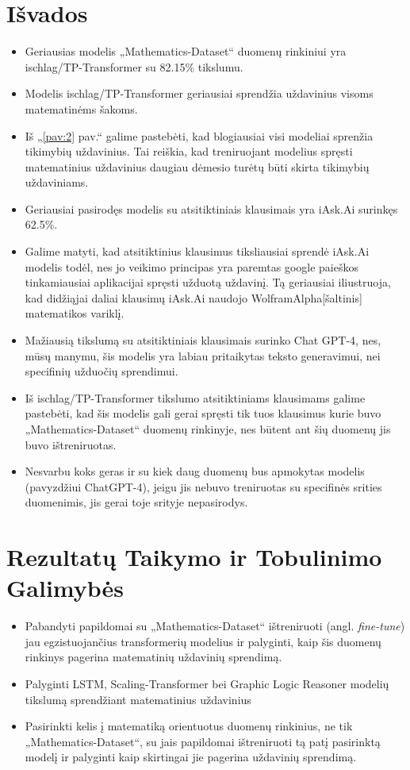 \documentclass[conference]{IEEEtran}
\begin{document}
\section{Išvados}
\begin{itemize}
    \item Geriausias modelis „Mathematics-Dataset“ duomenų rinkiniui yra ischlag/TP-Transformer su 82.15\% tikslumu.
    \item Modelis ischlag/TP-Transformer geriausiai sprendžia uždavinius visoms matematinėms šakoms.
    \item Iš „\ref{pav:2} pav.“ galime pastebėti, kad blogiausiai visi modeliai sprenžia tikimybių uždavinius. Tai reiškia, kad treniruojant modelius spręsti matematinius uždavinius daugiau dėmesio turėtų būti skirta tikimybių uždaviniams.
    \item Geriausiai pasirodęs modelis su atsitiktiniais klausimais yra iAsk.Ai surinkęs 62.5\%.
    \item Galime matyti, kad atsitiktinius klausimus tiksliausiai sprendė iAsk.Ai modelis todėl, nes jo veikimo principas yra paremtas google paieškos tinkamiausiai aplikacijai spręsti užduotą uždavinį. Tą geriausiai iliustruoja, kad didžiąjai daliai klausimų iAsk.Ai naudojo WolframAlpha[šaltinis] matematikos variklį.
    \item Mažiausią tikslumą su atsitiktiniais klausimais surinko Chat GPT-4, nes, mūsų manymu, šis modelis yra labiau pritaikytas teksto generavimui, nei specifinių užduočių sprendimui.
    \item Iš ischlag/TP-Transformer tikslumo atsitiktiniams klausimams galime pastebėti, kad šis modelis gali gerai spręsti tik tuos klausimus kurie buvo „Mathematics-Dataset“ duomenų rinkinyje, nes būtent ant šių duomenų jis buvo ištreniruotas.
    \item Nesvarbu koks geras ir su kiek daug duomenų bus apmokytas modelis (pavyzdžiui ChatGPT-4), jeigu jis nebuvo treniruotas su specifinės srities duomenimis, jis gerai toje srityje nepasirodys.
\end{itemize}
\section{Rezultatų Taikymo ir Tobulinimo Galimybės}
\begin{itemize}
    \item Pabandyti papildomai su „Mathematics-Dataset“ ištreniruoti (angl. \textit{fine-tune}) jau egzistuojančius transformerių modelius ir palyginti, kaip šis duomenų rinkinys pagerina matematinių uždavinių sprendimą.
    \item Palyginti LSTM, Scaling-Transformer bei Graphic Logic Reasoner modelių tikslumą sprendžiant matematinius uždavinius \cite{dataset}
    \item Pasirinkti kelis į matematiką orientuotus duomenų rinkinius, ne tik „Mathematics-Dataset“, su jais papildomai ištreniruoti tą patį pasirinktą modelį ir palyginti kaip skirtingai jie pagerina uždavinių sprendimą. 
\end{itemize}



\end{document}
